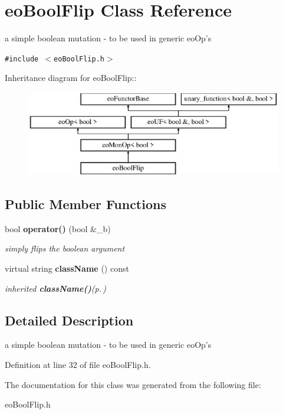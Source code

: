 \section{eo\-Bool\-Flip Class Reference}
\label{classeo_bool_flip}
a simple boolean mutation - to be used in generic eo\-Op's  


{\tt \#include $<$eo\-Bool\-Flip.h$>$}

Inheritance diagram for eo\-Bool\-Flip::\begin{figure}[H]
\begin{center}
\leavevmode
\includegraphics[height=3.73333cm]{classeo_bool_flip}
\end{center}
\end{figure}
\subsection*{Public Member Functions}
\begin{CompactItemize}
\item 
bool {\bf operator()} (bool \&\_\-b)\label{classeo_bool_flip_a0}

\begin{CompactList}\small\item\em simply flips the boolean argument \item\end{CompactList}\item 
virtual string {\bf class\-Name} () const \label{classeo_bool_flip_a1}

\begin{CompactList}\small\item\em inherited {\bf class\-Name()}{\rm (p.\,\pageref{classeo_bool_flip_a1})} \item\end{CompactList}\end{CompactItemize}


\subsection{Detailed Description}
a simple boolean mutation - to be used in generic eo\-Op's 



Definition at line 32 of file eo\-Bool\-Flip.h.

The documentation for this class was generated from the following file:\begin{CompactItemize}
\item 
eo\-Bool\-Flip.h\end{CompactItemize}
